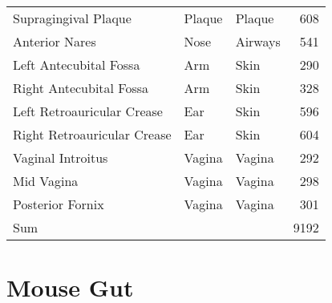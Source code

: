 \begin{table}[htb]
{\begin{center}
\begin{tabular}{lllr}
        Supragingival Plaque            & Plaque            & Plaque            & 608   \\
        Anterior Nares                  & Nose              & Airways           & 541   \\
        Left Antecubital Fossa          & Arm               & Skin              & 290   \\
        Right Antecubital Fossa         & Arm               & Skin              & 328   \\
        Left Retroauricular Crease      & Ear               & Skin              & 596   \\
        Right Retroauricular Crease     & Ear               & Skin              & 604   \\
        Vaginal Introitus               & Vagina            & Vagina            & 292   \\
        Mid Vagina                      & Vagina            & Vagina            & 298   \\
        Posterior Fornix                & Vagina            & Vagina            & 301   \\
        \midrule
        Sum                             &                   &                   & 9192  \\
        \bottomrule
    \end{tabular}
    \end{center}
}
\end{table}


\section{Mouse Gut}
\label{supp:sec:DetailsEmpiricalDatasets:sub:MouseGut}

